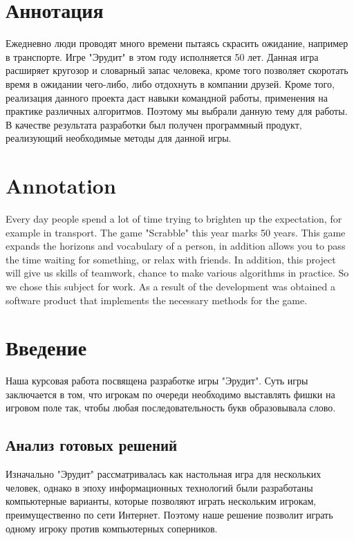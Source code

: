 \documentclass[a4paper,14pt]{article}
\begin{document}

\tableofcontents
\pagebreak
\section{Аннотация}
	Ежедневно люди проводят много времени пытаясь скрасить ожидание, например в транспорте. Игре "Эрудит" в этом году исполняется 50 лет. Данная игра расширяет кругозор и словарный запас человека, кроме того позволяет скоротать время в ожидании чего-либо, либо отдохнуть в компании друзей. Кроме того, реализация данного проекта даст навыки командной работы, применения на практике различных алгоритмов. Поэтому мы выбрали данную тему для работы. В качестве результата разработки был получен программный продукт, реализующий необходимые методы для данной игры.

\section*{Annotation}
Every day people spend a lot of time trying to brighten up the expectation, for example in transport. The game "Scrabble" this year marks 50 years. This game expands the horizons and vocabulary of a person, in addition allows you to pass the time waiting for something, or relax with friends. In addition, this project will give us skills of teamwork, chance to make various algorithms in practice. So we chose this subject for work. As a result of the development was obtained a software product that implements the necessary methods for the game.

\pagebreak

\section{Введение}
	Наша курсовая работа посвящена разработке игры "Эрудит". Суть игры заключается в том, что игрокам по очереди необходимо выставлять фишки на игровом поле так, чтобы любая последовательность букв образовывала слово.
	
	\subsection{Анализ готовых решений}
	Изначально "Эрудит" рассматривалась как настольная игра для нескольких человек, однако в эпоху информационных технологий были разработаны компьютерные варианты, которые позволяют играть нескольким игрокам, преимущественно по сети Интернет. Поэтому наше решение позволит играть одному игроку против компьютерных соперников.
	
\end{document}
